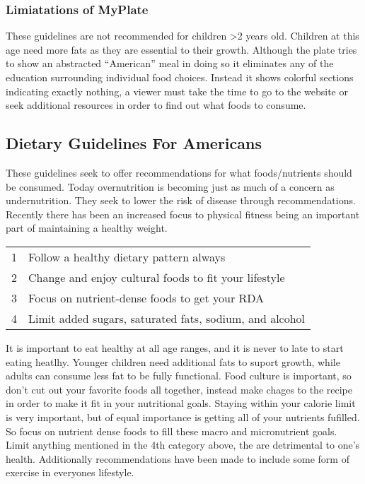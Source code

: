 \documentclass[letterpaper, 11pt]{article}
\begin{document}
\subsubsection{Limiatations of MyPlate}
\label{sec:org12bc6c5}
These guidelines are not recommended for children >2 years old. Children at this age need more fats as they are essential to their growth. Although the plate tries to show an abstracted ``American'' meal in doing so it eliminates any of the education surrounding individual food choices. Instead it shows colorful sections indicating exactly nothing, a viewer must take the time to go to the website or seek additional resources in order to find out what foods to consume.\\
\subsection{Dietary Guidelines For Americans}
\label{sec:org8274b96}
These guidelines seek to offer recommendations for what foods/nutrients should be consumed. Today overnutrition is becoming just as much of a concern as undernutrition. They seek to lower the risk of disease through recommendations. Recently there has been an increased focus to physical fitness being an important part of maintaining a healthy weight.\\
\begin{center}
\begin{tabular}{rl}
1 & Follow a healthy dietary pattern always\\
2 & Change and enjoy cultural foods to fit your lifestyle\\
3 & Focus on nutrient-dense foods to get your RDA\\
4 & Limit added sugars, saturated fats, sodium, and alcohol\\
\end{tabular}
\end{center}
It is important to eat healthy at all age ranges, and it is never to late to start eating heatlhy. Younger children need additional fats to suport growth, while adults can consume less fat to be fully functional. Food culture is important, so don't cut out your favorite foods all together, instead make chages to the recipe in order to make it fit in your nutritional goals. Staying within your calorie limit is very important, but of equal importance is getting all of your nutrients fufilled. So focus on nutrient dense foods to fill these macro and micronutrient goals. Limit anything mentioned in the 4th category above, the are detrimental to one's health. Additionally recommendations have been made to include some form of exercise in everyones lifestyle.\\
\end{document}
